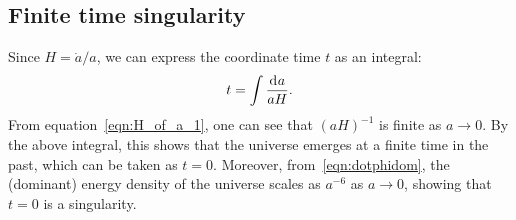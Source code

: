 \subsection{Finite time singularity}

Since \(H = \dot{a}/a\), we can express the coordinate time \(t\) as an integral: 
\begin{equation}
  t = \int \frac{\operatorname{d}^{}\!{a}}{aH}.
\end{equation}
From equation~\eqref{eqn:H_of_a_1}, one can see that \({(aH)}^{-1}\) is finite as \(a\to0\). By the above integral, this shows that the universe emerges at a finite time in the past, which can be taken as \(t=0\).  Moreover, from~\eqref{eqn:dotphidom}, the (dominant) energy density of the universe scales as \(a^{-6}\) as \(a \to 0\), showing that \(t=0\) is a singularity.

